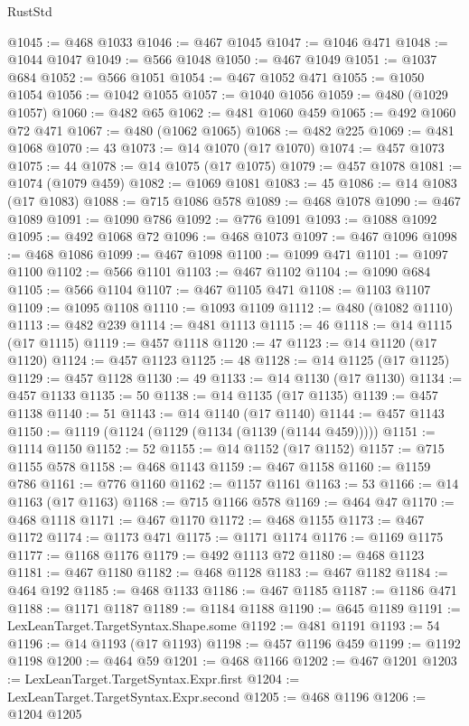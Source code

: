 \begin{lexlean}{RustStd}
\begin{coremodule}
{\begin{coremodule}
{{{{{{{{{{{{{{{{{{{{{{{{{{{{{{{{{@1045 := @468 @1033
@1046 := @467 @1045
@1047 := @1046 @471
@1048 := @1044 @1047
@1049 := @566 @1048
@1050 := @467 @1049
@1051 := @1037 @684
@1052 := @566 @1051
@1054 := @467 @1052 @471
@1055 := @1050 @1054
@1056 := @1042 @1055
@1057 := @1040 @1056
@1059 := @480 (@1029 @1057)
@1060 := @482 @65
@1062 := @481 @1060 @459
@1065 := @492 @1060 @72 @471
@1067 := @480 (@1062 @1065)
@1068 := @482 @225
@1069 := @481 @1068
@1070 := 43
@1073 := @14 @1070 (@17 @1070)
@1074 := @457 @1073
@1075 := 44
@1078 := @14 @1075 (@17 @1075)
@1079 := @457 @1078
@1081 := @1074 (@1079 @459)
@1082 := @1069 @1081
@1083 := 45
@1086 := @14 @1083 (@17 @1083)
@1088 := @715 @1086 @578
@1089 := @468 @1078
@1090 := @467 @1089
@1091 := @1090 @786
@1092 := @776 @1091
@1093 := @1088 @1092
@1095 := @492 @1068 @72
@1096 := @468 @1073
@1097 := @467 @1096
@1098 := @468 @1086
@1099 := @467 @1098
@1100 := @1099 @471
@1101 := @1097 @1100
@1102 := @566 @1101
@1103 := @467 @1102
@1104 := @1090 @684
@1105 := @566 @1104
@1107 := @467 @1105 @471
@1108 := @1103 @1107
@1109 := @1095 @1108
@1110 := @1093 @1109
@1112 := @480 (@1082 @1110)
@1113 := @482 @239
@1114 := @481 @1113
@1115 := 46
@1118 := @14 @1115 (@17 @1115)
@1119 := @457 @1118
@1120 := 47
@1123 := @14 @1120 (@17 @1120)
@1124 := @457 @1123
@1125 := 48
@1128 := @14 @1125 (@17 @1125)
@1129 := @457 @1128
@1130 := 49
@1133 := @14 @1130 (@17 @1130)
@1134 := @457 @1133
@1135 := 50
@1138 := @14 @1135 (@17 @1135)
@1139 := @457 @1138
@1140 := 51
@1143 := @14 @1140 (@17 @1140)
@1144 := @457 @1143
@1150 := @1119 (@1124 (@1129 (@1134 (@1139 (@1144 @459)))))
@1151 := @1114 @1150
@1152 := 52
@1155 := @14 @1152 (@17 @1152)
@1157 := @715 @1155 @578
@1158 := @468 @1143
@1159 := @467 @1158
@1160 := @1159 @786
@1161 := @776 @1160
@1162 := @1157 @1161
@1163 := 53
@1166 := @14 @1163 (@17 @1163)
@1168 := @715 @1166 @578
@1169 := @464 @47
@1170 := @468 @1118
@1171 := @467 @1170
@1172 := @468 @1155
@1173 := @467 @1172
@1174 := @1173 @471
@1175 := @1171 @1174
@1176 := @1169 @1175
@1177 := @1168 @1176
@1179 := @492 @1113 @72
@1180 := @468 @1123
@1181 := @467 @1180
@1182 := @468 @1128
@1183 := @467 @1182
@1184 := @464 @192
@1185 := @468 @1133
@1186 := @467 @1185
@1187 := @1186 @471
@1188 := @1171 @1187
@1189 := @1184 @1188
@1190 := @645 @1189
@1191 := LexLeanTarget.TargetSyntax.Shape.some
@1192 := @481 @1191
@1193 := 54
@1196 := @14 @1193 (@17 @1193)
@1198 := @457 @1196 @459
@1199 := @1192 @1198
@1200 := @464 @59
@1201 := @468 @1166
@1202 := @467 @1201
@1203 := LexLeanTarget.TargetSyntax.Expr.first
@1204 := LexLeanTarget.TargetSyntax.Expr.second
@1205 := @468 @1196
@1206 := @1204 @1205
}}}}}}}}}}}}}}}}}}}}}}}}}}}}}}}}}
\end{coremodule}}
\end{coremodule}
\end{lexlean}
